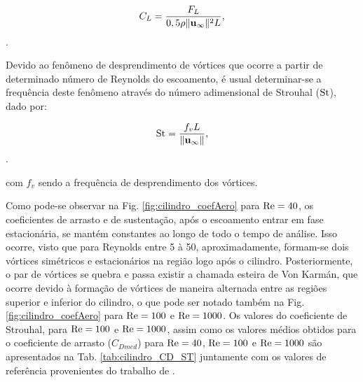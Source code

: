 \documentclass[tese_patricia]{subfiles}%
\begin{document}
\begin{align}
	C_L = \frac{F_L}{0,5\rho \lVert \mathbf{u}_{\infty} \lVert^{2} L},
\end{align}.

Devido ao fenômeno de desprendimento de vórtices que ocorre a partir de determinado número de Reynolds do escoamento, é usual determinar-se a frequência deste fenômeno através do número adimensional de Strouhal ($\mathrm{St}$), dado por:

\begin{align}
	\mathrm{St} = \frac{f_{v}L}{\lVert \mathbf{u}_{\infty} \lVert},
\end{align}.

\noindent com $f_{v}$ sendo a frequência de desprendimento dos vórtices.

Como pode-se observar na Fig. \ref{fig:cilindro_coefAero} para $\mathrm{Re} = 40$, os coeficientes de arrasto e de sustentação, após o escoamento entrar em fase estacionária, se mantém constantes ao longo de todo o tempo de análise. Isso ocorre, visto que para Reynolds entre 5 à 50, aproximadamente, formam-se dois vórtices simétricos e estacionários na região logo após o cilindro. Posteriormente, o par de vórtices se quebra e passa existir a chamada esteira de Von Karmán, que ocorre devido à formação de vórtices de maneira alternada entre as regiões superior e inferior do cilindro, o que pode ser notado também na Fig. \ref{fig:cilindro_coefAero}  para $\mathrm{Re} = 100$ e $\mathrm{Re}=1000$. Os valores do coeficiente de Strouhal, para $\mathrm{Re} = 100$ e $\mathrm{Re}=1000$, assim como os valores médios obtidos para o coeficiente de arrasto ($C_{Dmed}$) para $\mathrm{Re} = 40$, $\mathrm{Re} = 100$ e $\mathrm{Re} = 1000$ são apresentados na Tab. \ref{tab:cilindro_CD_ST} juntamente com os valores de referência provenientes do trabalho de .
\end{document}
